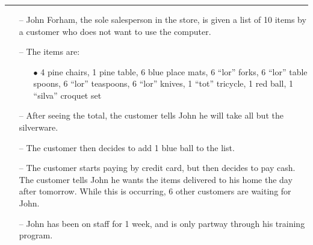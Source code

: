 \documentclass[pdf]{beamer}
\begin{document}
{%
\begin{frame}
\frametitle{\textcolor{myBlue}{{\textbf{\hspace{8mm}{Developing task examples: Cheap Shop}}}}}
\vspace*{-2mm}
\textcolor{red}{\rule{10cm}{1mm}}

\vspace{3mm}
\textcolor{myBlue}{\textbf{\hspace{2mm}{Task example 3}}}
\vspace{2mm}
\begin{itemize}
	\item[\textcolor{myBlue}{--}] \textcolor{myBlue}{{\small John Forham, the sole salesperson in the store, is given a list of 10 items by a customer who does not want to use the computer. }}
	\item[\textcolor{myBlue}{--}] \textcolor{myBlue}{The items are: }
		\begin{itemize}
			\item[\textcolor{myBlue}{$\bullet$}] \textcolor{myBlue}{{\footnotesize 4 pine chairs, 1 pine table, 6 blue place mats, 6 “lor” forks, 6 “lor” table spoons, 6 “lor” teaspoons, 6 “lor” knives, 1 “tot” tricycle, 1 red ball, 1 “silva” croquet set}}
		\end{itemize}  
	\item[\textcolor{myBlue}{--}] \textcolor{myBlue}{{\small After seeing the total, the customer tells John he will take all but the silverware.}}
    \item[\textcolor{myBlue}{--}] \textcolor{myBlue}{{\small The customer then decides to add 1 blue ball to the list.}}
    \item[\textcolor{myBlue}{--}] \textcolor{myBlue}{{\small The customer starts paying by credit card, but then decides to pay cash. The customer tells John he wants the items delivered to his home the day after tomorrow. While this is occurring, 6 other customers are waiting for John. }}
	\vspace{4mm}
    \item[\textcolor{myBlue}{--}]\textcolor{myBlue}{{\small John has been on staff for 1 week, and is only partway through his training program.}}
\end{itemize}
\end{frame}}
\end{document}
